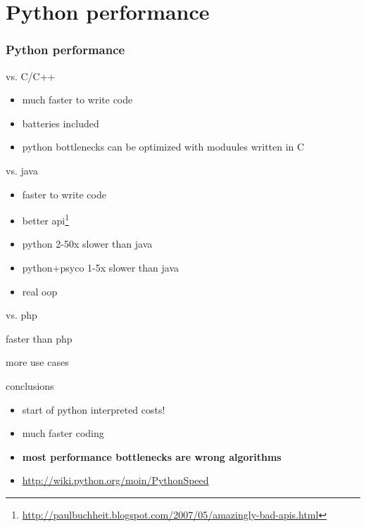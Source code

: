 \documentclass{beamer}
\begin{document}
\section{Python performance}	%
\begin{frame}[fragile]
    \frametitle{Python performance}
    \begin{block}{vs. C/C++}
    \begin{itemize}
        \item much faster to write code 
        \item batteries included
        \item python bottlenecks can be optimized with moduules written in C
    \end{itemize}
    \end{block}

    \begin{block}{vs. java}
    \begin{itemize}
        \item faster to write code
        \item better api\footnote{\url{http://paulbuchheit.blogspot.com/2007/05/amazingly-bad-apis.html}}
        \item python 2-50x slower than java
        \item python+psyco 1-5x slower than java
        \item real oop
    \end{itemize}
    \end{block}

    \begin{block}{vs. php}
        \item faster than php
        \item more use cases
    \end{block}

    \begin{alertblock}{conclusions}
    \begin{itemize}
        \item start of python interpreted costs!
        \item much faster coding
        \item \textbf{most performance bottlenecks are wrong algorithms}
        \item \url{http://wiki.python.org/moin/PythonSpeed}
    \end{itemize}
    \end{alertblock}
\end{frame}
\end{document}
